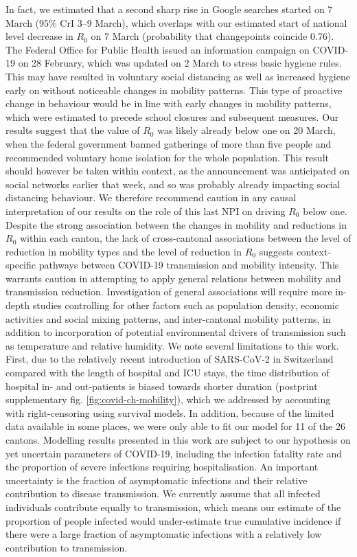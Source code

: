  In fact, we estimated that a second sharp rise in Google searches started on 7 March (95\% CrI 3–9 March), which overlaps with our estimated start of national level decrease in $R_0$ on 7 March (probability that changepoints coincide 0.76). The Federal Office for Public Health issued an information campaign on COVID-19 on 28 February, which was updated on 2 March to stress basic hygiene rules\cite{OFSP:NouvellesReglesHygiene:2020}. This may have resulted in voluntary social distancing as well as increased hygiene early on without noticeable changes in mobility patterns. This type of proactive change in behaviour would be in line with early changes in mobility patterns, which were estimated to precede school closures and subsequent measures. Our results suggest that the value of $R_0$ was likely already below one on 20 March, when the federal government banned gatherings of more than five people and recommended voluntary home isolation for the whole population. This result should however be taken within context, as the announcement was anticipated on social networks earlier that week, and so was probably already impacting social distancing behaviour. We therefore recommend caution in any causal interpretation of our results on the role of this last NPI on driving $R_0$ below one. Despite the strong association between the changes in mobility and reductions in $R_0$ within each canton, the lack of cross-cantonal associations between the level of reduction in mobility types and the level of reduction in $R_0$ suggests context-specific pathways between COVID-19 transmission and mobility intensity. This warrants caution in attempting to apply general relations between mobility and transmission reduction. Investigation of general associations will require more in-depth studies controlling for other factors such as population density, economic activities and social mixing patterns, and inter-cantonal mobility patterns, in addition to incorporation of potential environmental drivers of transmission such as temperature and relative humidity\cite{Neher:PotentialImpactSeasonal:2020, Kissler:ProjectingTransmissionDynamics:2020}. We note several limitations to this work. First, due to the relatively recent introduction of SARS-CoV-2 in Switzerland compared with the length of hospital and ICU stays, the time distribution of hospital in- and out-patients is biased towards shorter duration (postprint supplementary fig. \ref{fig:covid-ch-mobility}), which we addressed by accounting with right-censoring using survival models. In addition, because of the limited data available in some places, we were only able to fit our model for 11 of the 26 cantons. Modelling results presented in this work are subject to our hypothesis on yet uncertain parameters of COVID-19, including the infection fatality rate and the proportion of severe infections requiring hospitalisation. An important uncertainty is the fraction of asymptomatic infections and their relative contribution to disease transmission. We currently assume that all infected individuals contribute equally to transmission, which means our estimate of the proportion of people infected would under-estimate true cumulative incidence if there were a large fraction of asymptomatic infections with a relatively low contribution to transmission. 